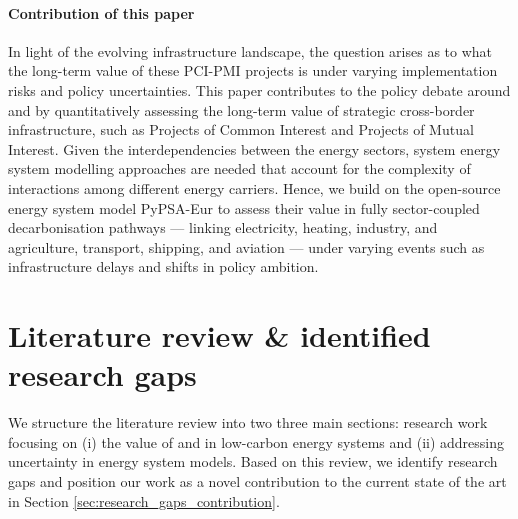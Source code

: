 \documentclass[preprint,12pt,sort&compress]{elsarticle}
\begin{document}
\paragraph{Contribution of this paper}
In light of the evolving infrastructure landscape, the question arises as to what the long-term value of these PCI-PMI projects is under varying implementation risks and policy uncertainties.
This paper contributes to the policy debate around  and  by quantitatively assessing the long-term value of strategic cross-border infrastructure, such as Projects of Common Interest and Projects of Mutual Interest. Given the interdependencies between the energy sectors, system energy system modelling approaches are needed that account for the complexity of interactions among different energy carriers. Hence, we build on the open-source energy system model PyPSA-Eur to assess their value in fully sector-coupled decarbonisation pathways --- linking electricity, heating, industry, and agriculture, transport, shipping, and aviation --- under varying events such as infrastructure delays and shifts in policy ambition. 

\section{Literature review \& identified research gaps}
\label{sec:literature_review}
We structure the literature review into two three main sections: research work focusing on (i) the value of  and  in low-carbon energy systems and (ii) addressing uncertainty in energy system models. Based on this review, we identify research gaps and position our work as a novel contribution to the current state of the art in Section \ref{sec:research_gaps_contribution}.
 
\end{document}
